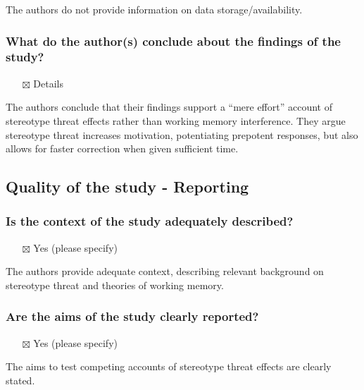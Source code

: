 \documentclass[
  doc, a4paper]{apa7}
\providecommand{\tightlist}{%
  \setlength{\itemsep}{0pt}\setlength{\parskip}{0pt}}
\begin{document}
The authors do not provide information on data storage/availability.

\subsubsection{What do the author(s) conclude about the findings of the study?}\label{what-do-the-authors-conclude-about-the-findings-of-the-study}

\begin{itemize}
\tightlist
\item[$\boxtimes$]
  Details
\end{itemize}

The authors conclude that their findings support a ``mere effort'' account of stereotype threat effects rather than working memory interference. They argue stereotype threat increases motivation, potentiating prepotent responses, but also allows for faster correction when given sufficient time.

\subsection{Quality of the study - Reporting}\label{quality-of-the-study---reporting}

\subsubsection{Is the context of the study adequately described?}\label{is-the-context-of-the-study-adequately-described}

\begin{itemize}
\tightlist
\item[$\boxtimes$]
  Yes (please specify)
\end{itemize}

The authors provide adequate context, describing relevant background on stereotype threat and theories of working memory.

\subsubsection{Are the aims of the study clearly reported?}\label{are-the-aims-of-the-study-clearly-reported}

\begin{itemize}
\tightlist
\item[$\boxtimes$]
  Yes (please specify)
\end{itemize}

The aims to test competing accounts of stereotype threat effects are clearly stated.
\end{document}
